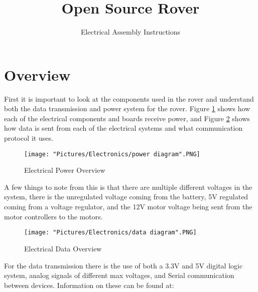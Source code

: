 \documentclass[12pt]{article}
\begin{document}
\title{Open Source Rover}
\author{Electrical Assembly Instructions}

\makeatletter         
\def\@maketitle{
\begin{center}	
	\makebox[\textwidth][c]{ \texttt{[image: "Pictures/Electronics/electronics title".png]}}
	{\Huge \bfseries \sffamily \@title }\\[4ex] 
	{\huge \bfseries \sffamily \@author}\\[4ex] 
	\texttt{[image: "Pictures/Electronics/JPL logo".png]}
\end{center}}
\makeatother

\maketitle

\newpage


\tableofcontents

\newpage

\section{Overview}

First it is important to look at the components used in the rover and understand both the data transmission and power system for the rover. Figure \ref{power} shows how each of the electrical components and boards receive power, and Figure \ref{data} shows how data is sent from each of the electrical systems and what communication protocol it uses. 
\begin{figure}[H]
  	\centering
    	\texttt{[image: "Pictures/Electronics/power diagram".PNG]}
  	\caption{Electrical Power Overview}
	\label{power}
\end{figure}

\noindent A few things to note from this is that there are multiple different voltages in the system, there is the unregulated voltage coming from the battery, 5V regulated coming from a voltage regulator, and the 12V motor voltage being sent from the motor controllers to the motors. 

\begin{figure}[H]
  	\centering
   	\texttt{[image: "Pictures/Electronics/data diagram".PNG]}
  	\caption{Electrical Data Overview}
	\label{data}
\end{figure}

\noindent For the data transmission there is the use of both a 3.3V and 5V digital logic system, analog signals of different max voltages, and Serial communication between devices. Information on these can be found at:
\end{document}
